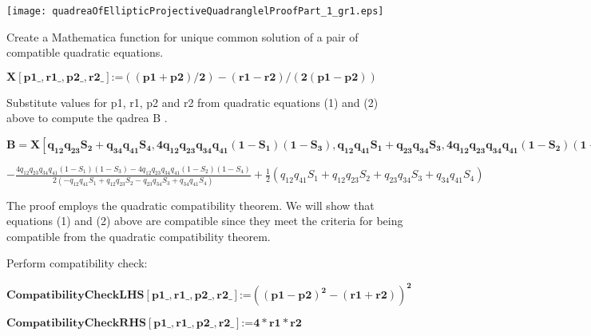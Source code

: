 \documentclass{article}
\begin{document}
\texttt{[image: quadreaOfEllipticProjectiveQuadranglelProofPart\_1\_gr1.eps]}

Create a Mathematica function for unique common solution of a pair of compatible quadratic equations.

\begin{doublespace}
\noindent\(\pmb{X[\text{p1$\_$},\text{r1$\_$},\text{p2$\_$},\text{r2$\_$}]\text{:=}((\text{p1}+\text{p2})/2)-(\text{r1}-\text{r2})/(2(\text{p1}-\text{p2}))}\)
\end{doublespace}

Substitute values for p1, r1, p2 and r2 from quadratic equations (1) and (2) above to compute the qadrea B .

\begin{doublespace}
\noindent\(\pmb{B=X\left[q_{12}q_{23}S_2+q_{34}q_{41}S_4,4q_{12}q_{23}q_{34}q_{41}\left(1-S_1\right)\left(1-S_3\right),q_{12}q_{41}S_1+q_{23}q_{34}S_3,4q_{12}q_{23}q_{34}q_{41}\left(1-S_2\right)\left(1-S_4\right)\right]}\)
\end{doublespace}

\begin{doublespace}
\noindent\(-\frac{4 q_{12} q_{23} q_{34} q_{41} \left(1-S_1\right) \left(1-S_3\right)-4 q_{12} q_{23} q_{34} q_{41} \left(1-S_2\right) \left(1-S_4\right)}{2
\left(-q_{12} q_{41} S_1+q_{12} q_{23} S_2-q_{23} q_{34} S_3+q_{34} q_{41} S_4\right)}+\frac{1}{2} \left(q_{12} q_{41} S_1+q_{12} q_{23} S_2+q_{23}
q_{34} S_3+q_{34} q_{41} S_4\right)\)
\end{doublespace}



The proof employs the quadratic compatibility theorem. We will show that equations (1) and (2) above are compatible since they meet the criteria
for being compatible from the quadratic compatibility theorem. 

Perform compatibility check:

\begin{doublespace}
\noindent\(\pmb{\text{CompatibilityCheckLHS} [\text{p1$\_$},\text{r1$\_$},\text{p2$\_$},\text{r2$\_$}]\text{:=}\left((\text{p1}-\text{p2})^2-(\text{r1}+\text{r2})\right)^2}\)
\end{doublespace}

\begin{doublespace}
\noindent\(\pmb{\text{CompatibilityCheckRHS} [\text{p1$\_$},\text{r1$\_$},\text{p2$\_$},\text{r2$\_$}]\text{:=} 4*\text{r1}*\text{r2}}\)
\end{doublespace}
\end{document}
